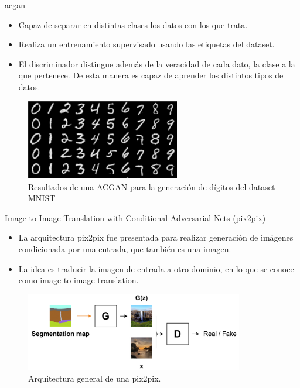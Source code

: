\begin{frame}{\gls{acgan}\cite{odena2016conditional}}

    \begin{itemize}
        \item Capaz de separar en distintas \alert{clases} los datos con los que trata.
        \item Realiza un entrenamiento \alert{supervisado} usando las etiquetas del dataset.
        \item El discriminador distingue además de la \alert{veracidad} de cada dato, la clase a la que pertenece. De esta manera es capaz de aprender los distintos tipos de datos.
    \end{itemize}
    
    \begin{figure}
        \centering
        \includegraphics[width=0.6\textwidth]{Slides/figures/GAN/ACGAN Results.PNG}
        \caption{Resultados de una ACGAN para la generación de dígitos del dataset MNIST\cite{lecun1998mnist}}
    \end{figure}
    
\end{frame}

\begin{frame}{Image-to-Image Translation with Conditional Adversarial Nets (pix2pix)\cite{isola2017image}}

    \begin{itemize}
        \item La arquitectura \alert{pix2pix} fue presentada para realizar generación de imágenes \alert{condicionada} por una entrada, que \alert{también es una imagen}.
        \item La idea es traducir la imagen de entrada a otro \alert{dominio}, en lo que se conoce como \alert{image-to-image translation}.
    \end{itemize}
    
    \begin{figure}
        \centering
        \includegraphics[width=0.85\textwidth]{Slides/figures/GAN/pix2pix.png}
        \caption{Arquitectura general de una pix2pix.}
    \end{figure}
    
\end{frame}

